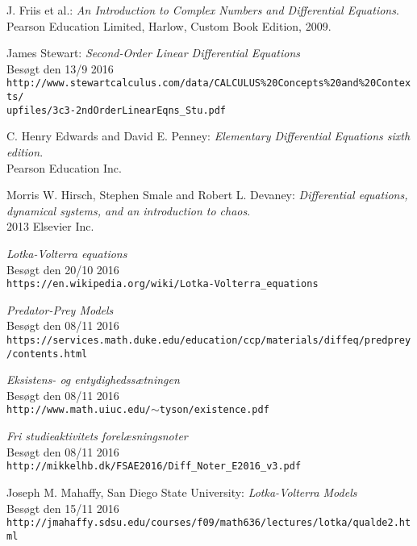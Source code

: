 \begin{thebibliography}{10}
J. Friis et al.: 
\textit{An Introduction to Complex Numbers and Differential Equations}. \\
Pearson Education Limited, Harlow, Custom Book Edition, 2009.

James Stewart:
\textit{Second-Order Linear Differential Equations} \\
Besøgt den 13/9 2016\\
\texttt{http://www.stewartcalculus.com/data/CALCULUS\%20Concepts\%20and\%20Contexts/\\upfiles/3c3-2ndOrderLinearEqns\_Stu.pdf}

C. Henry Edwards and David E. Penney: 
\textit{Elementary Differential Equations sixth edition}. \\
Pearson Education Inc.

Morris W. Hirsch, Stephen Smale and Robert L. Devaney: 
\textit{Differential equations, dynamical systems, and an introduction to chaos}. \\
2013 Elsevier Inc.

\textit{Lotka-Volterra equations} \\
Besøgt den 20/10 2016\\
\texttt{https://en.wikipedia.org/wiki/Lotka-Volterra\_equations}


\textit{Predator-Prey Models} \\
Besøgt den 08/11 2016\\
\texttt{https://services.math.duke.edu/education/ccp/materials/diffeq/predprey/contents.html}

\textit{Eksistens- og entydighedssætningen} \\
Besøgt den 08/11 2016 \\
\texttt{http://www.math.uiuc.edu/$\sim$tyson/existence.pdf}

\textit{Fri studieaktivitets forelæsningsnoter} \\
Besøgt den 08/11 2016 \\
\texttt{http://mikkelhb.dk/FSAE2016/Diff\_Noter\_E2016\_v3.pdf}

 Joseph M. Mahaffy, San Diego State University:
\textit{Lotka-Volterra Models} \\
Besøgt den 15/11 2016\\
\texttt{http://jmahaffy.sdsu.edu/courses/f09/math636/lectures/lotka/qualde2.html}


\end{thebibliography}
